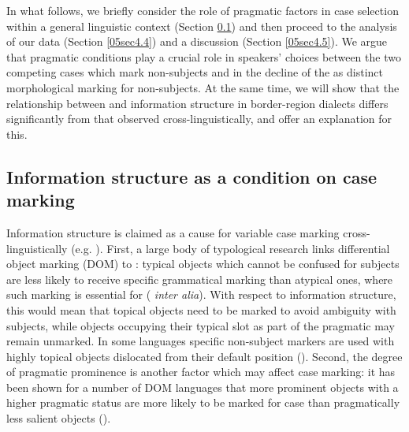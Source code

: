 \documentclass[output=paper,colorlinks,citecolor=brown]{langscibook}
\begin{document}
In what follows, we briefly consider the role of pragmatic factors in case selection within a general linguistic context (Section \ref{05sec4.3}) and then proceed to the analysis of our data (Section \ref{05sec4.4}) and a discussion (Section \ref{05sec4.5}). We argue that pragmatic conditions play a crucial role in speakers' choices between the two competing cases which mark non-subjects and in the decline of the  as distinct morphological marking for non-subjects. At the same time, we will show that the relationship between  and information structure in  border-region dialects differs significantly from that observed cross-linguistically, and offer an explanation for this.

\subsection{Information structure as a condition on case marking} \label{05sec4.3}

Information structure is claimed as a cause for variable case marking cross\hyp{}linguistically (e.g. \citealt{aikhenvald2010, iemmolo2010, valle2011, dalrymplenikolaeva2011}). First, a large body of typological research links differential object marking (DOM) to : typical objects which cannot be confused for subjects are less likely to receive specific grammatical marking than atypical ones, where such marking is essential for  (\citealt{silverstein1976, comrie1977} \emph{inter alia}). With respect to information structure, this would mean that topical objects need to be marked to avoid ambiguity with subjects, while objects occupying their typical slot as part of the pragmatic  may remain unmarked. In some languages specific non-subject markers are used with highly topical objects dislocated from their default position (\citealt{iemmolo2010, aikhenvald2003}). Second, the degree of pragmatic prominence is another factor which may affect case marking: it has been shown for a number of DOM languages that more prominent objects with a higher pragmatic status are more likely to be marked for case than pragmatically less salient objects (\citealt{aissen2003, malchukov2008}).
\end{document}
